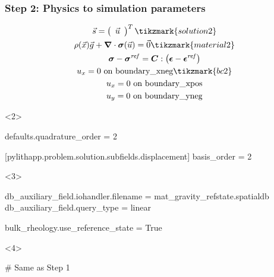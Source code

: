 \documentclass[aspectratio=169]{beamer}
\begin{document}
\begin{frame}[t,fragile]
  \frametitle{Step 2: Physics to simulation parameters}
  \summary{}

  \begin{minipage}[t]{0.3\textwidth}
    {\scriptsize
    \begin{gather*}
    \vec{s} = \left(\begin{array}{c} \vec{u} \end{array}\right)^T \tikzmark{solution2}\\
    \rho(\vec{x}) \vec{g} + \tensor{\nabla} \cdot \tensor{\sigma}(\vec{u}) = \vec{0} \tikzmark{material2}\\
    \tensor{\sigma} - \tensor{\sigma}^\mathit{ref} = \tensor{C} : \left(\tensor{\epsilon}-\tensor{\epsilon}^\mathit{ref}\right) \\
    u_x = 0 \text{ on boundary\_xneg} \tikzmark{bc2}\\
    u_x = 0 \text{ on boundary\_xpos} \\
    u_y = 0 \text{ on boundary\_yneg} \\
    \end{gather*}}
  \end{minipage}
  \hfill
  \begin{minipage}[t]{0.67\textwidth}
    \begin{onlyenv}<2>
      \begin{cfgcode}
        defaults.quadrature_order = 2

        [pylithapp.problem.solution.subfields.displacement]
        basis_order = 2
      \end{cfgcode}
    \end{onlyenv}
    \begin{onlyenv}<3>
      \begin{cfgcode}
        db_auxiliary_field.iohandler.filename = mat_gravity_refstate.spatialdb
        db_auxiliary_field.query_type = linear

        bulk_rheology.use_reference_state = True
      \end{cfgcode}
    \end{onlyenv}
    \begin{onlyenv}<4>
      \begin{cfgcode}
        # Same as Step 1
      \end{cfgcode}
    \end{onlyenv}
  \end{minipage}


\end{frame}
\end{document}
